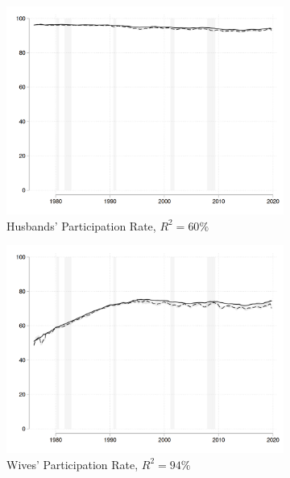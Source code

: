 \documentclass[a4paper,12pt]{article}
\begin{document}
\begin{figure}[H]
	\centering
	\caption{Goodness of Fit of the Steady-State Approximation}
  \begin{subfigure}[b]{0.475\textwidth}
    \centering
    \includegraphics[scale= 0.125]{Y04_QSA_Prate_DeNUN1_sex1_flowtype0.png}
    \caption{Husbands' Participation Rate, $R^2 = 60\%$ }
  \end{subfigure}
  \begin{subfigure}[b]{0.475\textwidth}
    \centering
    \includegraphics[scale= 0.125]{Y04_QSA_Prate_DeNUN1_sex2_flowtype0.png}
    \caption{Wives' Participation Rate, $R^2 = 94\%$ }
  \end{subfigure}
  \begin{subfigure}[b]{0.475\textwidth}

\end{subfigure}
\end{figure}
\end{document}
